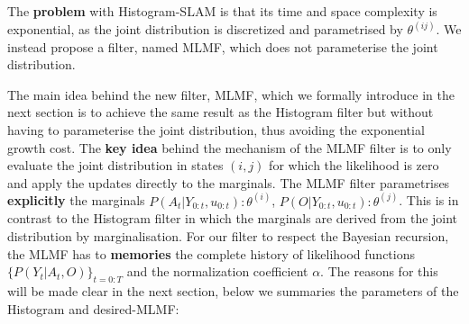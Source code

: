 The \textbf{problem} with Histogram-SLAM is that its time and space complexity is exponential, as the joint distribution is discretized and 
parametrised by $\theta^{(ij)}$. We instead propose a filter, named MLMF, which does not parameterise the joint distribution.

The main idea behind the new filter, MLMF, which we formally introduce in the next section is to achieve the same result as 
the Histogram filter but without having to parameterise the joint distribution, thus avoiding the exponential growth cost. 
The \textbf{key idea} behind the mechanism of the MLMF filter is to only evaluate the joint distribution in states $(i,j)$ for which the likelihood 
is zero and apply the updates directly to the marginals. The MLMF filter parametrises \textbf{explicitly} the marginals 
$P(A_t|Y_{0:t},u_{0:t}): \theta^{(i)}$, $P(O|Y_{0:t},u_{0:t}): \theta^{(j)}$. This is in contrast to the Histogram filter in which the marginals are  
derived from the joint distribution by marginalisation. For our filter to respect the Bayesian recursion, the MLMF has to \textbf{memories}
the complete history of likelihood functions $\{P(Y_t|A_t,O)\}_{t=0:T}$ and the normalization coefficient $\alpha$. The reasons 
for this will be made clear in the next section, below we summaries the parameters of the Histogram and desired-MLMF:

\begin{center}
\begin{minipage}{0.55\textwidth}
\end{minipage}
\end{center}




